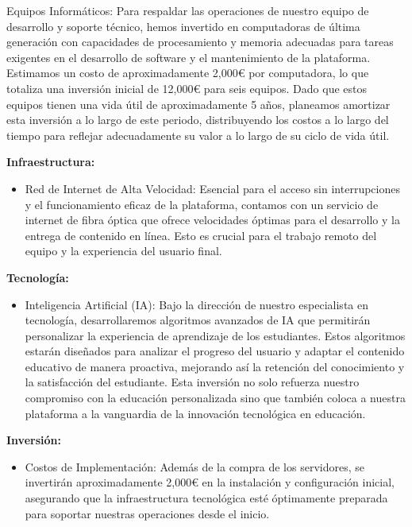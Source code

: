\documentclass[
]{article}
\providecommand{\tightlist}{%
  \setlength{\itemsep}{0pt}\setlength{\parskip}{0pt}}
\begin{document}
Equipos Informáticos: Para respaldar las operaciones de nuestro equipo
de desarrollo y soporte técnico, hemos invertido en computadoras de
última generación con capacidades de procesamiento y memoria adecuadas
para tareas exigentes en el desarrollo de software y el mantenimiento de
la plataforma. Estimamos un costo de aproximadamente 2,000€ por
computadora, lo que totaliza una inversión inicial de 12,000€ para seis
equipos. Dado que estos equipos tienen una vida útil de aproximadamente
5 años, planeamos amortizar esta inversión a lo largo de este periodo,
distribuyendo los costos a lo largo del tiempo para reflejar
adecuadamente su valor a lo largo de su ciclo de vida útil.

\textbf{Infraestructura:}

\begin{itemize}
\tightlist
\item
  Red de Internet de Alta Velocidad: Esencial para el acceso sin
  interrupciones y el funcionamiento eficaz de la plataforma, contamos
  con un servicio de internet de fibra óptica que ofrece velocidades
  óptimas para el desarrollo y la entrega de contenido en línea. Esto es
  crucial para el trabajo remoto del equipo y la experiencia del usuario
  final.
\end{itemize}

\textbf{Tecnología:}

\begin{itemize}
\tightlist
\item
  Inteligencia Artificial (IA): Bajo la dirección de nuestro
  especialista en tecnología, desarrollaremos algoritmos avanzados de IA
  que permitirán personalizar la experiencia de aprendizaje de los
  estudiantes. Estos algoritmos estarán diseñados para analizar el
  progreso del usuario y adaptar el contenido educativo de manera
  proactiva, mejorando así la retención del conocimiento y la
  satisfacción del estudiante. Esta inversión no solo refuerza nuestro
  compromiso con la educación personalizada sino que también coloca a
  nuestra plataforma a la vanguardia de la innovación tecnológica en
  educación.
\end{itemize}

\textbf{Inversión:}

\begin{itemize}
\tightlist
\item
  Costos de Implementación: Además de la compra de los servidores, se
  invertirán aproximadamente 2,000€ en la instalación y configuración
  inicial, asegurando que la infraestructura tecnológica esté
  óptimamente preparada para soportar nuestras operaciones desde el
  inicio.
\end{itemize}
\end{document}
